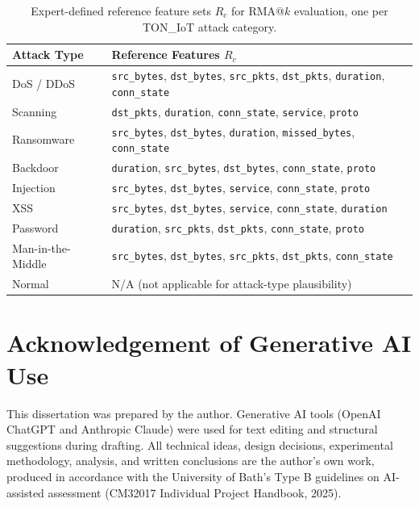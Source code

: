 \documentclass[12pt,a4paper]{report}
\begin{document}
\begin{table}[H]
\centering
\caption{Expert-defined reference feature sets $R_c$ for RMA@$k$ evaluation, one per TON\_IoT attack category.}
\label{tab:reference}
\begin{tabular}{lp{8cm}}
\toprule
\textbf{Attack Type} & \textbf{Reference Features $R_c$} \\
\midrule
DoS / DDoS & \texttt{src\_bytes}, \texttt{dst\_bytes}, \texttt{src\_pkts}, \texttt{dst\_pkts}, \texttt{duration}, \texttt{conn\_state} \\
Scanning & \texttt{dst\_pkts}, \texttt{duration}, \texttt{conn\_state}, \texttt{service}, \texttt{proto} \\
Ransomware & \texttt{src\_bytes}, \texttt{dst\_bytes}, \texttt{duration}, \texttt{missed\_bytes}, \texttt{conn\_state} \\
Backdoor & \texttt{duration}, \texttt{src\_bytes}, \texttt{dst\_bytes}, \texttt{conn\_state}, \texttt{proto} \\
Injection & \texttt{src\_bytes}, \texttt{dst\_bytes}, \texttt{service}, \texttt{conn\_state}, \texttt{proto} \\
XSS & \texttt{src\_bytes}, \texttt{dst\_bytes}, \texttt{service}, \texttt{conn\_state}, \texttt{duration} \\
Password & \texttt{duration}, \texttt{src\_pkts}, \texttt{dst\_pkts}, \texttt{conn\_state}, \texttt{proto} \\
Man-in-the-Middle & \texttt{src\_bytes}, \texttt{dst\_bytes}, \texttt{src\_pkts}, \texttt{dst\_pkts}, \texttt{conn\_state} \\
Normal & N/A (not applicable for attack-type plausibility) \\
\bottomrule
\end{tabular}
\end{table}

\chapter{Acknowledgement of Generative AI Use}
\label{app:ai}

This dissertation was prepared by the author. Generative AI tools (OpenAI ChatGPT and Anthropic Claude) were used for text editing and structural suggestions during drafting. All technical ideas, design decisions, experimental methodology, analysis, and written conclusions are the author's own work, produced in accordance with the University of Bath's Type B guidelines on AI-assisted assessment (CM32017 Individual Project Handbook, 2025).
\end{document}
